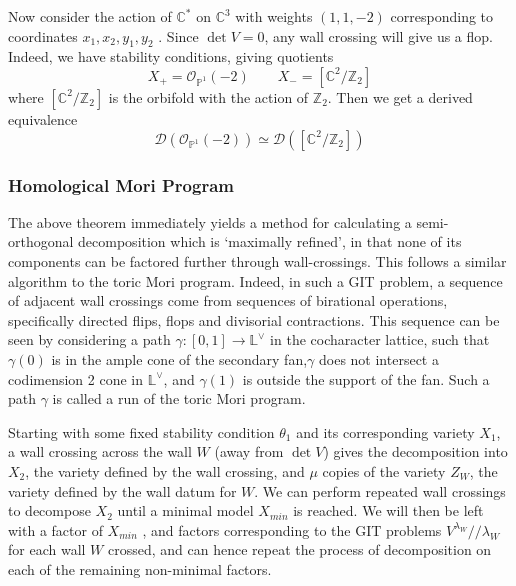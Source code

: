 \begin{example}{}{}
    Now consider the action of $\mathbb{C}^{*}$ on $\mathbb{C}^3$ with weights $(1,1,-2)$ corresponding to coordinates $x_{1},x_{2},y_1,y_2$ .  Since $\det V = 0$, any wall crossing will give us a flop. Indeed, we have stability conditions, giving quotients $$X_{+}= \mathcal{O}_{\mathbb{P}^{1}}(-2) \qquad X_{-}= [\mathbb{C}^{2}/ \mathbb{Z}_2]  $$where $[\mathbb{C}^2/\mathbb{Z}_2]$ is the orbifold with the action of $\mathbb{Z}_2$. Then we get a derived equivalence $$\mathcal{D}(\mathcal{O}_{\mathbb{P}^{1}}(-2))\simeq \mathcal{D}([\mathbb{C}^{2}/\mathbb{Z}_{2}])$$
\end{example}


\subsubsection{Homological Mori Program}

The above theorem immediately yields a method for calculating a semi-orthogonal decomposition which is `maximally refined', in that none of its components can be factored further through wall-crossings. This follows a similar algorithm to the toric Mori program. Indeed, in such a GIT problem, a sequence of adjacent wall crossings come from sequences of birational operations, specifically directed flips, flops and divisorial contractions. This sequence can be seen by considering a path $\gamma : [0,1] \to \mathbb{L}^\vee$ in the cocharacter lattice, such that $\gamma(0)$ is in the ample cone of the secondary fan,$\gamma$ does not intersect a codimension 2 cone in $\mathbb{L}^\vee$, and $\gamma(1)$ is outside the support of the fan. Such a path $\gamma$ is called a run of the toric Mori program.

Starting with some fixed stability condition $\theta _1$ and its corresponding variety $X_1$, a wall crossing across the wall $W$ (away from $\det V$) gives the decomposition into $X_2$, the variety defined by the wall crossing, and $\mu$ copies of the variety $Z_W$, the variety defined by the wall datum for $W$. We can perform repeated wall crossings to decompose $X_2$ until a minimal model $X_{min}$ is reached. We will then be left with a factor of $X_{min}$ , and factors corresponding to the GIT problems $V^{\lambda_{W}} / / \lambda_{W}$ for each wall $W$ crossed, and can hence repeat the process of decomposition on each of the remaining non-minimal factors.

